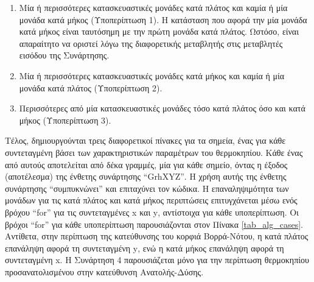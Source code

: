 \documentclass[12pt, a4paper]{report} %
\newcommand{\english}{\foreignlanguage{english}}
\begin{document}
\begin{enumerate}
    \item Μία ή περισσότερες κατασκευαστικές μονάδες κατά πλάτος και καμία ή μία μονάδα κατά μήκος (Υποπερίπτωση 1). Η κατάσταση που αφορά την μία μονάδα κατά μήκος είναι ταυτόσημη με την πρώτη μονάδα κατά πλάτος. Ωστόσο, είναι απαραίτητο να οριστεί λόγω της διαφορετικής μεταβλητής στις μεταβλητές εισόδου της Συνάρτησης.
    \item Μία ή περισσότερες κατασκευαστικές μονάδες κατά μήκος και καμία ή μία μονάδα κατά πλάτος (Υποπερίπτωση 2).
    \item Περισσότερες από μία κατασκευαστικές μονάδες τόσο κατά πλάτος όσο και κατά μήκος (Υποπερίπτωση 3).
\end{enumerate}

Τέλος, δημιουργούνται τρεις διαφορετικοί πίνακες για τα σημεία, ένας για κάθε συντεταγμένη βάσει των χαρακτηριστικών 
παραμέτρων του θερμοκηπίου. Κάθε ένας από αυτούς αποτελείται από δέκα γραμμές, μία για κάθε σημείο, όντας η έξοδος 
(αποτέλεσμα) της ένθετης συνάρτησης \english{“GrhXYZ”}. Η χρήση αυτής της ένθετης συνάρτησης “συμπυκνώνει” και 
επιταχύνει τον κώδικα. Η επαναληψιμότητα των μονάδων για τις κατά πλάτος και κατά μήκος περιπτώσεις επιτυγχάνεται μέσω 
ενός βρόχου \english{“for”} για τις συντεταγμένες \english{x} και \english{y}, αντίστοιχα για κάθε υποπερίπτωση. Οι 
βρόχοι \english{“for”} για κάθε υποπερίπτωση παρουσιάζονται στον Πίνακα \ref{tab_alg_cases}. Αντίθετα, στην περίπτωση 
της κατεύθυνσης του κορφιά Βορρά-Νότου, η κατά πλάτος επανάληψη αφορά τη συντεταγμένη \english{y}, ενώ η κατά μήκος 
επανάληψη αφορά τη συντεταγμένη \english{x}. Η Συνάρτηση 4 παρουσιάζεται μόνο για την περίπτωση θερμοκηπίου 
προσανατολισμένου στην κατεύθυνση Ανατολής-Δύσης.
\end{document}
